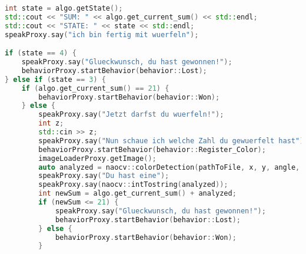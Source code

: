 \begin{lstlisting}[language=c++,
                   caption={Mainloop, Teil 6},
                   label={lst:main6}]
int state = algo.getState();
std::cout << "SUM: " << algo.get_current_sum() << std::endl;
std::cout << "STATE: " << state << std::endl;
speakProxy.say("ich bin fertig mit wuerfeln");

if (state == 4) {
    speakProxy.say("Glueckwunsch, du hast gewonnen!");
    behaviorProxy.startBehavior(behavior::Lost);
} else if (state == 3) {
    if (algo.get_current_sum() == 21) {
        behaviorProxy.startBehavior(behavior::Won);
    } else {
        speakProxy.say("Jetzt darfst du wuerfeln!");
        int z;
        std::cin >> z;
        speakProxy.say("Nun schaue ich welche Zahl du gewuerfelt hast");
        behaviorProxy.startBehavior(behavior::Register_Color);
        imageLoaderProxy.getImage();
        auto analyzed = naocv::colorDetection(pathToFile, x, y, angle, false);
        speakProxy.say("Du hast eine");
        speakProxy.say(naocv::intTostring(analyzed));
        int newSum = algo.get_current_sum() + analyzed;
        if (newSum <= 21) {
            speakProxy.say("Glueckwunsch, du hast gewonnen!");
            behaviorProxy.startBehavior(behavior::Lost);
        } else {
            behaviorProxy.startBehavior(behavior::Won);
        }
\end{lstlisting}
